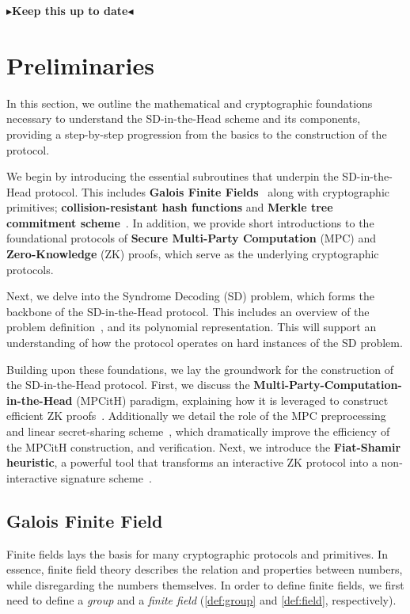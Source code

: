 \documentclass[11pt]{report}
\theoremstyle{definition}
\theoremstyle{plain}
\newcommand{\todo}[1]{{\color[rgb]{.5,0,0}\textbf{$\blacktriangleright$#1$\blacktriangleleft$}}}
\begin{document}
\todo{Keep this up to date}


\chapter{Preliminaries}\label{ch:prelim}

In this section, we outline the mathematical and cryptographic foundations necessary to understand the SD-in-the-Head scheme and its components, providing a step-by-step progression from the basics to the construction of the protocol.

We begin by introducing the essential subroutines that underpin the SD-in-the-Head protocol. This includes \textbf{Galois Finite Fields}~\cite{martinez2023syndromes, reed1960polynomial, brownadvanced} along with cryptographic primitives; \textbf{collision-resistant hash functions} and \textbf{Merkle tree commitment scheme}~\cite{becker2008merkle}. In addition, we provide short introductions to the foundational protocols of \textbf{Secure Multi-Party Computation} (MPC) and \textbf{Zero-Knowledge} (ZK) proofs, which serve as the underlying cryptographic protocols.

Next, we delve into the Syndrome Decoding (SD) problem, which forms the backbone of the SD-in-the-Head protocol. This includes an overview of the problem definition~\cite{aguilarsyndrome11, mceliece1978public, berlekamp1978inherent, baldi2013optimization}, and its polynomial representation. This will support an understanding of how the protocol operates on hard instances of the SD problem.

Building upon these foundations, we lay the groundwork for the construction of the SD-in-the-Head protocol. First, we discuss the \textbf{Multi-Party-Computation-in-the-Head} (MPCitH) paradigm, explaining how it is leveraged to construct efficient ZK proofs~\cite{ishai2007zero}. Additionally we detail the role of the MPC preprocessing~\cite{baum2020concretely} and linear secret-sharing scheme~\cite{feneuil2023threshold}, which dramatically improve the efficiency of the MPCitH construction, and verification. Next, we introduce the \textbf{Fiat-Shamir heuristic}, a powerful tool that transforms an interactive ZK protocol into a non-interactive signature scheme~\cite{fiat1986prove}.

\section{Galois Finite Field}\label{sec:gf256}
Finite fields lays the basis for many cryptographic protocols and primitives. In essence, finite field theory describes the relation and properties between numbers, while disregarding the numbers themselves. In order to define finite fields, we first need to define a \textit{group} and a \textit{finite field} (\autoref{def:group} and \autoref{def:field}, respectively).
\end{document}
